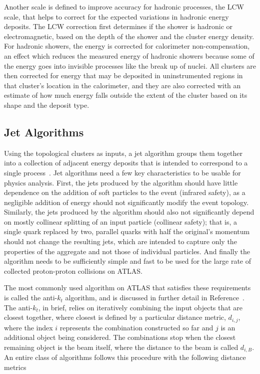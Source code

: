Another scale is defined to improve accuracy for hadronic processes, the \ac{LCW} scale, that helps to correct for the expected variations in hadronic energy deposits.
The \ac{LCW} correction first determines if the shower is hadronic or electromagnetic, based on the depth of the shower and the cluster energy density.
For hadronic showers, the energy is corrected for calorimeter non-compensation, an effect which reduces the measured energy of hadronic showers because some of the energy goes into invisible processes like the break up of nuclei.
All clusters are then corrected for energy that may be deposited in uninstrumented regions in that cluster's location in the calorimeter, and they are also corrected with an estimate of how much energy falls outside the extent of the cluster based on its shape and the deposit type.

\subsection{Jet Algorithms}
Using the topological clusters as inputs, a jet algorithm groups them together into a collection of adjacent energy deposits that is intended to correspond to a single process~\cite{ATL-PHYS-PUB-2015-036}.
Jet algorithms need a few key characteristics to be usable for physics analysis.
First, the jets produced by the algorithm should have little dependence on the addition of soft particles to the event (infrared safety), as a negligible addition of energy should not significantly modify the event topology.
Similarly, the jets produced by the algorithm should also not significantly depend on mostly collinear splitting of an input particle (collinear safety); that is, a single quark replaced by two, parallel quarks with half the original's momentum should not change the resulting jets, which are intended to capture only the properties of the aggregate and not those of individual particles.
And finally the algorithm needs to be sufficiently simple and fast to be used for the large rate of collected proton-proton collisions on \ac{ATLAS}.

The most commonly used algorithm on \ac{ATLAS} that satisfies these requirements is called the anti-$k_t$ algorithm, and is discussed in further detail in Reference~\cite{antikt}.
The anti-$k_t$, in brief, relies on iteratively combining the input objects that are closest together, where closest is defined by a particular distance metric, $d_{i,j}$, where the index $i$ represents the combination constructed so far and $j$ is an additional object being considered.
The combinations stop when the closest remaining object is the beam itself, where the distance to the beam is called $d_{i,B}$. 
An entire class of algorithms follows this procedure with the following distance metrics

